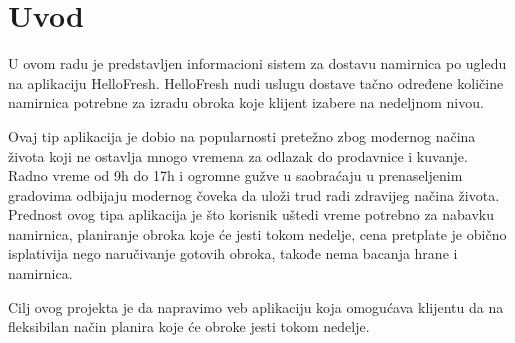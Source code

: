 \section{Uvod}

	U ovom radu je predstavljen informacioni sistem za dostavu namirnica po 
ugledu na aplikaciju HelloFresh. HelloFresh nudi uslugu dostave tačno određene količine namirnica potrebne za izradu obroka koje klijent izabere na nedeljnom nivou. 

	Ovaj tip aplikacija je dobio na popularnosti pretežno zbog modernog načina života koji ne ostavlja mnogo vremena za odlazak do prodavnice i kuvanje. Radno vreme od 9h do 17h i ogromne gužve u saobraćaju u prenaseljenim gradovima odbijaju modernog čoveka da uloži trud radi zdravijeg načina života. Prednost ovog tipa aplikacija je što korisnik uštedi vreme potrebno za nabavku namirnica, planiranje obroka koje će jesti tokom nedelje, cena pretplate je obično isplativija nego naručivanje gotovih obroka, takođe nema bacanja hrane i namirnica.
	
	Cilj ovog projekta je da napravimo veb aplikaciju koja omogućava klijentu da na fleksibilan način planira koje će obroke jesti tokom nedelje. 
